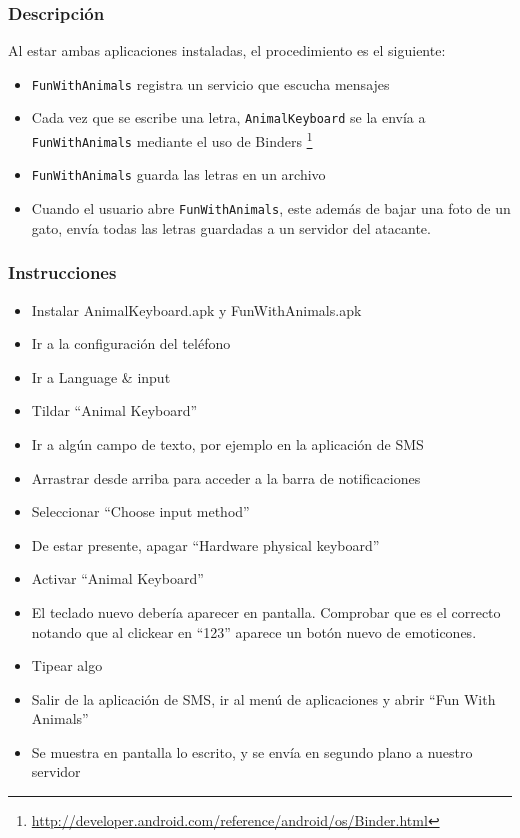 		\subsubsection{Descripción}
		Al estar ambas aplicaciones instaladas, el procedimiento es el siguiente:
			\begin{itemize}
				\item \texttt{FunWithAnimals} registra un servicio que escucha mensajes
				\item Cada vez que se escribe una letra, \texttt{AnimalKeyboard} se la envía a \texttt{FunWithAnimals} mediante el uso de Binders \footnote{\url{http://developer.android.com/reference/android/os/Binder.html}}
				\item \texttt{FunWithAnimals} guarda las letras en un archivo
				\item Cuando el usuario abre \texttt{FunWithAnimals}, este además de bajar una foto de un gato, envía todas las letras guardadas a un servidor del atacante.
			\end{itemize}

		\subsubsection{Instrucciones}
			\begin{itemize}
				\item Instalar AnimalKeyboard.apk y FunWithAnimals.apk
				\item Ir a la configuración del teléfono
				\item Ir a Language \& input
				\item Tildar ``Animal Keyboard''
				\item Ir a algún campo de texto, por ejemplo en la aplicación de SMS
				\item Arrastrar desde arriba para acceder a la barra de notificaciones
				\item Seleccionar ``Choose input method''
				\item De estar presente, apagar ``Hardware physical keyboard''
				\item Activar ``Animal Keyboard''
				\item El teclado nuevo debería aparecer en pantalla. Comprobar que es el correcto notando que al clickear en ``123'' aparece un botón nuevo de emoticones.
				\item Tipear algo
				\item Salir de la aplicación de SMS, ir al menú de aplicaciones y abrir ``Fun With Animals''
				\item Se muestra en pantalla lo escrito, y se envía en segundo plano a nuestro servidor
			\end{itemize}
